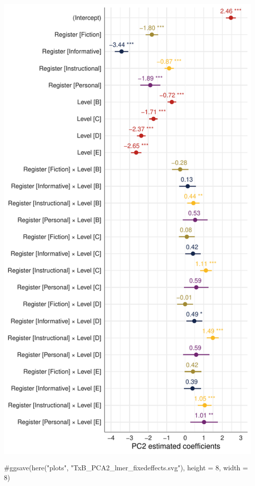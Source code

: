 \documentclass[
  letterpaper,
  DIV=11,
  numbers=noendperiod]{scrreprt}
\newenvironment{Shaded}{\begin{snugshade}}{\end{snugshade}}
\newcommand{\CommentTok}[1]{\textcolor[rgb]{0.37,0.37,0.37}{#1}}
\begin{document}
\includegraphics{AppendixF_files/figure-pdf/Dim2fixed-1.pdf}

\begin{Shaded}
\begin{Highlighting}[]
\CommentTok{\#ggsave(here("plots", "TxB\_PCA2\_lmer\_fixedeffects.svg"), height = 8, width = 8)}
\end{Highlighting}
\end{Shaded}
\end{document}
